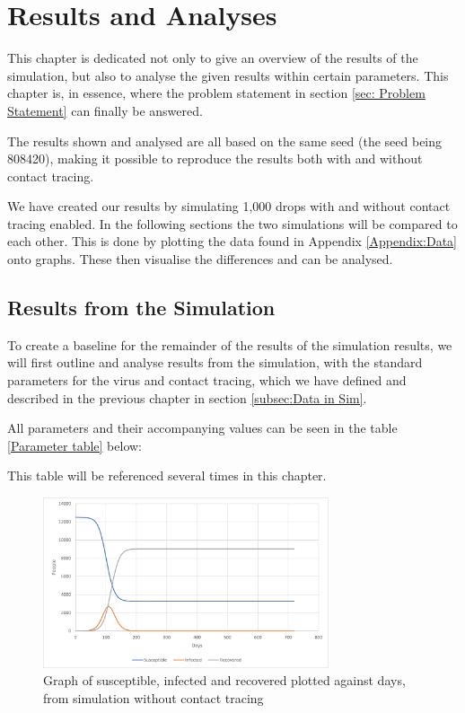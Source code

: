 \chapter{Results and Analyses} \label{chap:result}

This chapter is dedicated not only to give an overview of the results of the simulation, but also to analyse the given results within certain parameters. This chapter is, in essence, where the problem statement in section \vref{sec: Problem Statement} can finally be answered.

The results shown and analysed are all based on the same seed (the seed being 808420), making it possible to reproduce the results both with and without contact tracing. 

We have created our results by simulating 1,000 drops with and without contact tracing enabled. In the following sections the two simulations will be compared to each other. This is done by plotting the data found in Appendix \ref{Appendix:Data} onto graphs. These then visualise the differences and can be analysed. 

\section{Results from the Simulation}

To create a baseline for the remainder of the results of the simulation results, we will first outline and analyse results from the simulation, with the standard parameters for the virus and contact tracing, which we have defined and described in the previous chapter in section \ref{subsec:Data in Sim}.

All parameters and their accompanying values can be seen in the table \vref{Parameter table} below:



This table will be referenced several times in this chapter.

\begin{figure}[H]
    \centering
    \includegraphics[width=0.75\textwidth]{0_billeder/Sim_CT_OFF.png}
    \caption{Graph of susceptible, infected and recovered plotted against days, from simulation without contact tracing}
    \label{fig:Sim_CT_OFF-1}
\end{figure}

